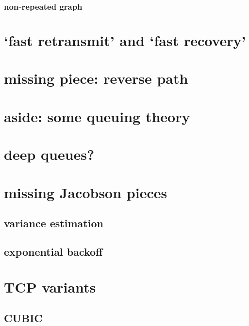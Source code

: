 \subsubsection{non-repeated graph}



\section{`fast retransmit' and `fast recovery'}
\section{missing piece: reverse path}


\section{aside: some queuing theory}


\section{deep queues?}


\section{missing Jacobson pieces}
\subsection{variance estimation}


\subsection{exponential backoff}


\section{TCP variants}


\subsection{CUBIC}



